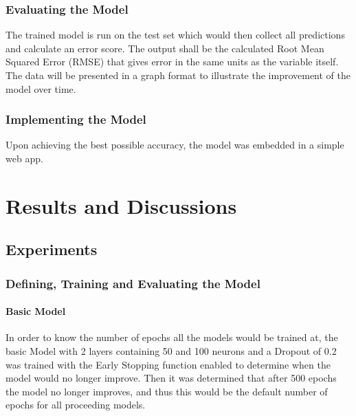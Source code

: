 \documentclass[10pt,11pt,12pt,oneside]{book}
\begin{document}
    \subsection{Evaluating the Model}
    The trained model is run on the test set which would then collect all predictions and calculate an error score. The output shall be the calculated Root Mean Squared Error (RMSE) that gives error in the same units as the variable itself. The data will be presented in a graph format to illustrate the improvement of the model over time.
    \subsection{Implementing the Model}
    Upon achieving the best possible accuracy, the model was embedded in a simple web app.

\chapter{Results and Discussions}
\section{Experiments}

\subsection{Defining, Training and Evaluating the Model}
\subsubsection{Basic Model}
In order to know the number of epochs all the models would be trained at, the basic Model with 2 layers containing 50 and 100 neurons and a Dropout of 0.2 was trained with the Early Stopping function enabled to determine when the model would no longer improve. Then it was determined that after 500 epochs the model no longer improves, and thus this would be the default number of epochs for all proceeding models.
\end{document}
